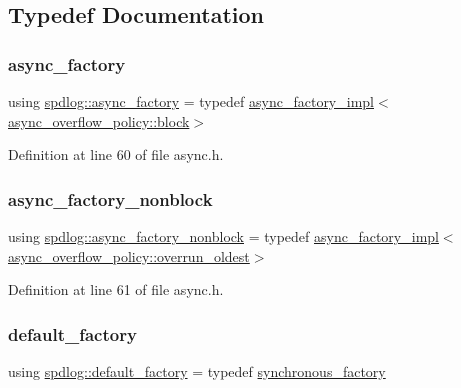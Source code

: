 \subsection{Typedef Documentation}
\mbox{\label{namespacespdlog_a962b94a80258f9a202d590888349577c}} 
\subsubsection{\texorpdfstring{async\+\_\+factory}{async\_factory}}
{\footnotesize\ttfamily using \hyperlink{namespacespdlog_a962b94a80258f9a202d590888349577c}{spdlog\+::async\+\_\+factory} = typedef \hyperlink{structspdlog_1_1async__factory__impl}{async\+\_\+factory\+\_\+impl}$<$\hyperlink{namespacespdlog_a42e109759a11c9514d3f6313a7709852a14511f2f5564650d129ca7cabc333278}{async\+\_\+overflow\+\_\+policy\+::block}$>$}



Definition at line 60 of file async.\+h.

\mbox{\label{namespacespdlog_a796f2e548cff4f12a5b2a52b07d3128b}} 
\subsubsection{\texorpdfstring{async\+\_\+factory\+\_\+nonblock}{async\_factory\_nonblock}}
{\footnotesize\ttfamily using \hyperlink{namespacespdlog_a796f2e548cff4f12a5b2a52b07d3128b}{spdlog\+::async\+\_\+factory\+\_\+nonblock} = typedef \hyperlink{structspdlog_1_1async__factory__impl}{async\+\_\+factory\+\_\+impl}$<$\hyperlink{namespacespdlog_a42e109759a11c9514d3f6313a7709852a6d09cc54ae10145444aa2f43fe46d9f2}{async\+\_\+overflow\+\_\+policy\+::overrun\+\_\+oldest}$>$}



Definition at line 61 of file async.\+h.

\mbox{\label{namespacespdlog_a349fb42bd8e759a32021b46fcdaca6c6}} 
\subsubsection{\texorpdfstring{default\+\_\+factory}{default\_factory}}
{\footnotesize\ttfamily using \hyperlink{namespacespdlog_a349fb42bd8e759a32021b46fcdaca6c6}{spdlog\+::default\+\_\+factory} = typedef \hyperlink{structspdlog_1_1synchronous__factory}{synchronous\+\_\+factory}}



